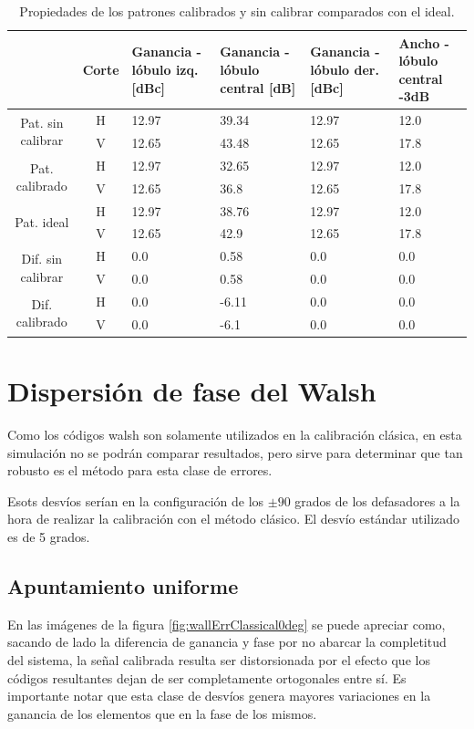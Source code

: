 \begin{table}[H]
  \footnotesize
  \centering
  \begin{tabular}{|c|c|p{2cm}|p{2.5cm}|p{2.5cm}|p{2.5cm}|}
    \cline{2-6}
    \multicolumn{1}{c|}{} & Corte & Ganancia - lóbulo izq. [dBc] & Ganancia - lóbulo central [dB] &
    Ganancia - lóbulo der. [dBc] & Ancho - lóbulo central -3dB \tabularnewline\hline
    \multirow{2}{2cm}{Pat. sin calibrar} & H & 12.97 & 39.34 & 12.97 & 12.0 \tabularnewline\cline{2-6}
     & V & 12.65 & 43.48 & 12.65 & 17.8 \tabularnewline\hline
    \multirow{2}{2cm}{Pat. calibrado} & H & 12.97 & 32.65 & 12.97 & 12.0 \tabularnewline\cline{2-6}
     & V & 12.65 & 36.8 & 12.65 & 17.8 \tabularnewline\hline
    \multirow{2}{2cm}{Pat. ideal} & H & 12.97 & 38.76 & 12.97 & 12.0 \tabularnewline\cline{2-6}
     & V & 12.65 & 42.9 & 12.65 & 17.8 \tabularnewline\hline
    \multirow{2}{2cm}{Dif. sin calibrar} & H & 0.0 & 0.58 & 0.0 & 0.0\tabularnewline\cline{2-6}
     & V & 0.0 & 0.58 & 0.0 & 0.0 \tabularnewline\hline
    \multirow{2}{2cm}{Dif. calibrado} & H & 0.0 & -6.11 & 0.0 & 0.0 \tabularnewline\cline{2-6}
     & V & 0.0 & -6.1 & 0.0 & 0.0 \tabularnewline\hline
  \end{tabular}
  \caption{Propiedades de los patrones calibrados y sin calibrar comparados con el ideal.}
  \label{tab:chirpRepErrClassical10degRow}
\end{table}


\section{Dispersión de fase del Walsh}

Como los códigos walsh son solamente utilizados en la calibración clásica, en esta simulación no se podrán comparar 
resultados, pero sirve para determinar que tan robusto es el método para esta clase de errores. 

Esots desvíos serían en la configuración de los $\pm 90$ grados de los defasadores a la hora de realizar la calibración con 
el método clásico. El desvío estándar utilizado es de 5 grados. 

\subsection{Apuntamiento uniforme}

En las imágenes de la figura \ref{fig:wallErrClassical0deg} se puede apreciar como, sacando de lado la diferencia de ganancia 
y fase por no abarcar la completitud del sistema, la señal calibrada resulta ser distorsionada por el efecto que los códigos 
resultantes dejan de ser completamente ortogonales entre sí. Es importante notar que esta clase de desvíos genera mayores 
variaciones en la ganancia de los elementos que en la fase de los mismos.

